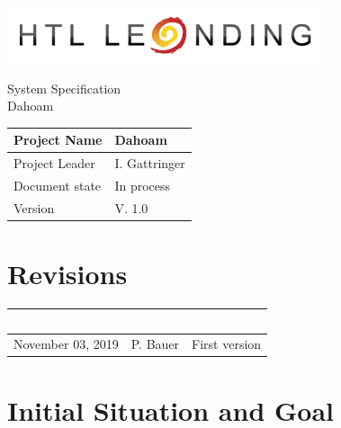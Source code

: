 \documentclass[12pt]{article}
\theoremstyle{definition}
\newcommand{\projectname}{Dahoam}
\newcommand{\productname}{Dahoam}
\newcommand{\projectleader}{I. Gattringer}
\newcommand{\documentstatus}{In process}
\newcommand{\version}{V. 1.0}
\begin{document}
\begin{titlepage}
\begin{flushright}
\includegraphics[scale=.5]{htlleondinglogo.png}\\
\end{flushright}

\vspace{10em}

\begin{center}
{\Huge System Specification} \\[3em]
{\LARGE \productname} \\[3em]
\end{center}

\begin{flushleft}
\begin{tabular}{|l|l|}
\hline
Project Name & \projectname \\ \hline
Project Leader & \projectleader \\ \hline
Document state & \documentstatus \\ \hline
Version & \version \\ \hline
\end{tabular}
\end{flushleft}

\end{titlepage}
\section*{Revisions}
\begin{tabular}{|l|l|l|}
\hline
\cellcolor[gray]{0.5}\textcolor{white}{Date} & \cellcolor[gray]{0.5}\textcolor{white}{Author} & \cellcolor[gray]{0.5}\textcolor{white}{Change} \\ \hline
November 03, 2019&P. Bauer&First version \\ \hline
\end{tabular}
\pagebreak

\tableofcontents
\pagebreak

\section{Initial Situation and Goal}  
\end{document}
